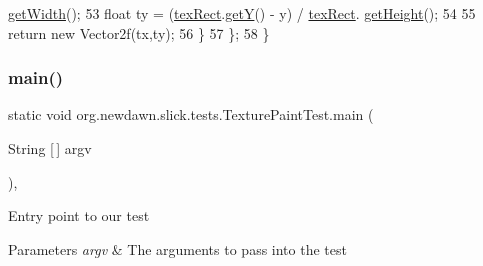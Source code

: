 \begin{DoxyCode}
      \mbox{\hyperlink{classorg_1_1newdawn_1_1slick_1_1geom_1_1_rectangle_ae2fddc33461303a9ccf8854c1e93c9c1}{getWidth}}();
53                 \textcolor{keywordtype}{float} ty = (\mbox{\hyperlink{classorg_1_1newdawn_1_1slick_1_1tests_1_1_texture_paint_test_aad56335d65c2c5a35f0b2475c7187886}{texRect}}.\mbox{\hyperlink{classorg_1_1newdawn_1_1slick_1_1geom_1_1_shape_a5f334f962d8fc525d522fe0f8ac20b35}{getY}}() - y) / \mbox{\hyperlink{classorg_1_1newdawn_1_1slick_1_1tests_1_1_texture_paint_test_aad56335d65c2c5a35f0b2475c7187886}{texRect}}.
      \mbox{\hyperlink{classorg_1_1newdawn_1_1slick_1_1geom_1_1_rectangle_a6c8878e73b4ca0d7a3c2d4e6bcd421ee}{getHeight}}();
54                 
55                 \textcolor{keywordflow}{return} \textcolor{keyword}{new} Vector2f(tx,ty);
56             \}
57         \};
58     \}
\end{DoxyCode}
\mbox{\label{classorg_1_1newdawn_1_1slick_1_1tests_1_1_texture_paint_test_ac0a3ed027d60359b21b4b1a73f14ffc4}} 
\subsubsection{\texorpdfstring{main()}{main()}}
{\footnotesize\ttfamily static void org.\+newdawn.\+slick.\+tests.\+Texture\+Paint\+Test.\+main (\begin{DoxyParamCaption}\item[{String \mbox{[}$\,$\mbox{]}}]{argv }\end{DoxyParamCaption})\hspace{0.3cm}{\ttfamily [inline]}, {\ttfamily [static]}}

Entry point to our test


\begin{DoxyParams}{Parameters}
{\em argv} & The arguments to pass into the test \\
\hline
\end{DoxyParams}

